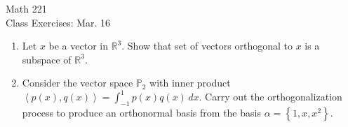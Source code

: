 \documentclass[11pt]{article}
\begin{document}
\begin{center}
\Large
\rm{Math 221}
\\
\rm{Class Exercises:  Mar. 16}
\\
\end{center}
\vspace{0.2in}

\begin{enumerate}
	\item{Let $x$ be a vector in $\mathbb{R}^3$.  Show that set of vectors orthogonal to $x$ is a subspace of $\mathbb{R}^3$.
	
}

\vspace{2in}

	\item{Consider the vector space $\mathbb{P}_2$ with inner product $\left<p(x),q(x)\right> = \int_{-1}^1 p(x)q(x)\,dx$.  Carry out the orthogonalization process to produce an orthonormal basis from the basis $\alpha=\left\{1,x,x^2\right\}$.}

\vspace{1in}
\end{enumerate}
\end{document}
